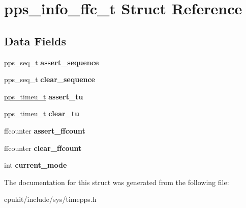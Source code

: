 \hypertarget{structpps__info__ffc__t}{}\section{pps\+\_\+info\+\_\+ffc\+\_\+t Struct Reference}
\label{structpps__info__ffc__t}
\subsection*{Data Fields}
\begin{DoxyCompactItemize}
\item 
\mbox{\label{structpps__info__ffc__t_a46445d05769fabc6dadbc48a42c1bbc6}} 
pps\+\_\+seq\+\_\+t {\bfseries assert\+\_\+sequence}
\item 
\mbox{\label{structpps__info__ffc__t_a694eb1f301e55df91cda24840ec78510}} 
pps\+\_\+seq\+\_\+t {\bfseries clear\+\_\+sequence}
\item 
\mbox{\label{structpps__info__ffc__t_a75a2ed9f4ec8c2e4594fceda426a9526}} 
\mbox{\hyperlink{unionpps__timeu}{pps\+\_\+timeu\+\_\+t}} {\bfseries assert\+\_\+tu}
\item 
\mbox{\label{structpps__info__ffc__t_a55e6908cedda035de02b17dbf036979b}} 
\mbox{\hyperlink{unionpps__timeu}{pps\+\_\+timeu\+\_\+t}} {\bfseries clear\+\_\+tu}
\item 
\mbox{\label{structpps__info__ffc__t_aaf9744729d2a63cb441f556a284ae66b}} 
ffcounter {\bfseries assert\+\_\+ffcount}
\item 
\mbox{\label{structpps__info__ffc__t_a0214ebb22a5629fdc07be6d7c91a2ef6}} 
ffcounter {\bfseries clear\+\_\+ffcount}
\item 
\mbox{\label{structpps__info__ffc__t_a95c99d95a5a60c09d489595fab540ff9}} 
int {\bfseries current\+\_\+mode}
\end{DoxyCompactItemize}


The documentation for this struct was generated from the following file\+:\begin{DoxyCompactItemize}
\item 
cpukit/include/sys/timepps.\+h\end{DoxyCompactItemize}
